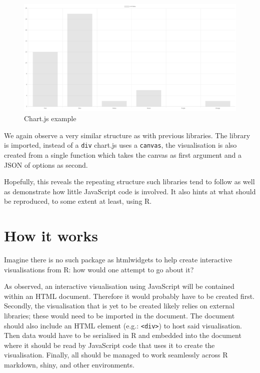 \documentclass[
]{krantz}
\begin{document}
\begin{figure}[t]

{\centering \includegraphics[width=1\linewidth]{images/candidate-chartjs} 

}

\caption{Chart.js example}\label{fig:candidate-chartjs}
\end{figure}

We again observe a very similar structure as with previous libraries. The library is imported, instead of a \texttt{div} chart.js uses a \texttt{canvas}, the visualisation is also created from a single function which takes the canvas as first argument and a JSON of options as second.

Hopefully, this reveals the repeating structure such libraries tend to follow as well as demonstrate how little JavaScript code is involved. It also hints at what should be reproduced, to some extent at least, using R.

\hypertarget{widgets-basics-inner-workings}{%
\section{How it works}\label{widgets-basics-inner-workings}}

Imagine there is no such package as htmlwidgets to help create interactive visualisations from R: how would one attempt to go about it?

As observed, an interactive visualisation using JavaScript will be contained within an HTML document. Therefore it would probably have to be created first. Secondly, the visualisation that is yet to be created likely relies on external libraries; these would need to be imported in the document. The document should also include an HTML element (e.g.: \texttt{\textless{}div\textgreater{}}) to host said visualisation. Then data would have to be serialised in R and embedded into the document where it should be read by JavaScript code that uses it to create the visualisation. Finally, all should be managed to work seamlessly across R markdown, shiny, and other environments.
\end{document}
